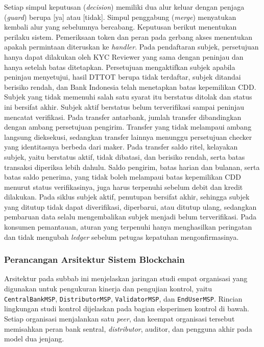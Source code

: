 Setiap simpul keputusan (\textit{decision}) memiliki dua alur keluar dengan penjaga (\textit{guard}) berupa [ya] atau [tidak]. Simpul penggabung (\textit{merge}) menyatukan kembali alur yang sebelumnya bercabang. Keputusan berikut menentukan perilaku sistem. Pemeriksaan token dan peran pada gerbang akses menentukan apakah permintaan diteruskan ke \textit{handler}. Pada pendaftaran subjek, persetujuan hanya dapat dilakukan oleh KYC Reviewer yang sama dengan peninjau dan hanya setelah batas ditetapkan. Persetujuan mengaktifkan subjek apabila peninjau menyetujui, hasil DTTOT berupa tidak terdaftar, subjek ditandai berisiko rendah, dan Bank Indonesia telah menetapkan batas kepemilikan CDD. Subjek yang tidak memenuhi salah satu syarat itu berstatus ditolak dan status ini bersifat akhir. Subjek aktif berstatus belum terverifikasi sampai peninjau mencatat verifikasi. Pada transfer antarbank, jumlah transfer dibandingkan dengan ambang persetujuan pengirim. Transfer yang tidak melampaui ambang langsung dieksekusi, sedangkan transfer lainnya menunggu persetujuan checker yang identitasnya berbeda dari maker. Pada transfer saldo ritel, kelayakan subjek, yaitu berstatus aktif, tidak dibatasi, dan berisiko rendah, serta batas transaksi diperiksa lebih dahulu. Saldo pengirim, batas harian dan bulanan, serta batas saldo penerima, yang tidak boleh melampaui batas kepemilikan CDD menurut status verifikasinya, juga harus terpenuhi sebelum debit dan kredit dilakukan. Pada siklus subjek aktif, penutupan bersifat akhir, sehingga subjek yang ditutup tidak dapat diverifikasi, diperbarui, atau ditutup ulang, sedangkan pembaruan data selalu mengembalikan subjek menjadi belum terverifikasi. Pada konsumen pemantauan, aturan yang terpenuhi hanya menghasilkan peringatan dan tidak mengubah \textit{ledger} sebelum petugas kepatuhan mengonfirmasinya.

\subsubsection{Perancangan Arsitektur Sistem Blockchain}

Arsitektur pada subbab ini menjelaskan jaringan studi empat organisasi yang
digunakan untuk pengukuran kinerja dan pengujian kontrol, yaitu
\texttt{CentralBankMSP}, \texttt{DistributorMSP}, \texttt{ValidatorMSP}, dan
\texttt{EndUserMSP}. Rincian lingkungan studi kontrol dijelaskan pada bagian
eksperimen kontrol di bawah. Setiap organisasi menjalankan satu \textit{peer}, dan keempat organisasi tersebut memisahkan peran bank sentral, \textit{distributor}, auditor, dan pengguna akhir pada model dua jenjang.

